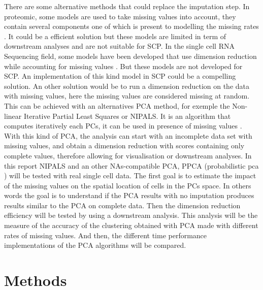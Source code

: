 \documentclass[a4paper, 11pt, twocolumn]{article}
\begin{document}
There are some alternative methods that could replace the imputation step. In proteomic, some models are used to take missing values into account, they contain several components one of which is present to modelling the missing rates \citep{goeminne_msqrob_2020, obrien_effects_2018}. It could be a efficient solution but these models are limited in term of downstream analyses and are not suitable for SCP. In the single cell RNA Sequencing field, some models have been developed that use dimension reduction while accounting for missing values \citep{risso_general_2018}. But these models are not developed for SCP. An implementation of this kind model in SCP could be a compelling solution. An other solution would be to run a dimension reduction on the data with missing values, here the missing values are considered missing at random. This can be achieved with an alternatives PCA method, for exemple the Non-linear Iterative Partial Least Squares or NIPALS. It is an algorithm that computes iteratively each PCs, it can be used in presence of missing values \citep{preda_nipals_2010}. With this kind of PCA, the analysis can start with an incomplete data set with missing values, and obtain a dimension reduction with scores containing only complete values, therefore allowing for visualisation or downstream analyses. In this report NIPALS and an other NAs-compatible PCA, PPCA (probabilistic pca \citep{tipping_probabilistic_1999}) will be tested with real single cell data. The first goal is to estimate the impact of the missing values on the spatial location of cells in the PCs space. In others words the goal is to understand if the PCA results with no imputation produces results similar to the PCA on complete data. Then the dimension reduction efficiency will be tested by using a downstream analysis. This analysis will be the measure of the accuracy of the clustering obtained with PCA made with different rates of missing values. And then, the different time performance implementations of the PCA algorithms will be compared. 

\section{Methods}
\end{document}
